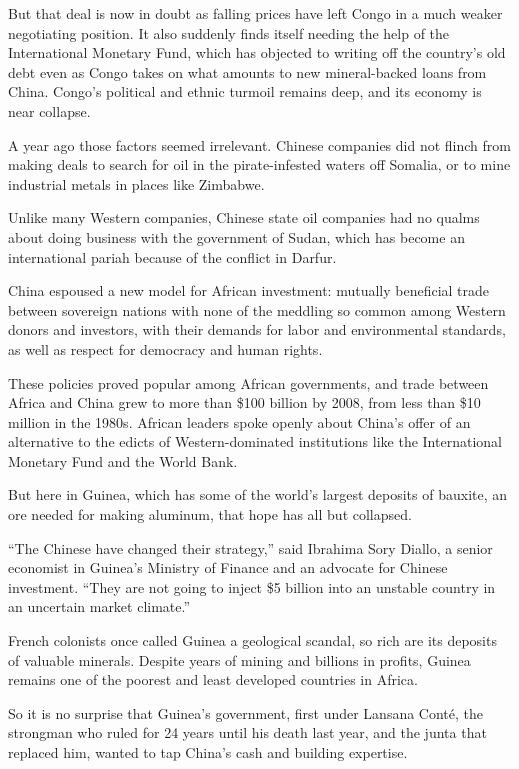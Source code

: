 \documentclass[12pt,a4paper,onecolumn]{article}
\begin{document}
\begin{CJK*}{GBK}{song}
But that deal is now in doubt as falling prices have left Congo in a much weaker negotiating
position. It also suddenly finds itself needing the help of the International Monetary Fund, which
has objected to writing off the country's old debt even as Congo takes on what amounts to new
mineral-backed loans from China. Congo's political and ethnic turmoil remains deep, and its economy
is near collapse.

A year ago those factors seemed irrelevant. Chinese companies did not flinch from making deals to
search for oil in the pirate-infested waters off Somalia, or to mine industrial metals in places
like Zimbabwe.

Unlike many Western companies, Chinese state oil companies had no qualms about doing business with
the government of Sudan, which has become an international pariah because of the conflict in Darfur.

China espoused a new model for African investment: mutually beneficial trade between sovereign
nations with none of the meddling so common among Western donors and investors, with their demands
for labor and environmental standards, as well as respect for democracy and human rights.

These policies proved popular among African governments, and trade between Africa and China grew to
more than \$100 billion by 2008, from less than \$10 million in the 1980s. African leaders spoke
openly about China's offer of an alternative to the edicts of Western-dominated institutions like
the International Monetary Fund and the World Bank.

But here in Guinea, which has some of the world's largest deposits of bauxite, an ore needed for
making aluminum, that hope has all but collapsed.

``The Chinese have changed their strategy,'' said Ibrahima Sory Diallo, a senior economist in
Guinea's Ministry of Finance and an advocate for Chinese investment. ``They are not going to inject
\$5 billion into an unstable country in an uncertain market climate.''

French colonists once called Guinea a geological scandal, so rich are its deposits of valuable
minerals. Despite years of mining and billions in profits, Guinea remains one of the poorest and
least developed countries in Africa.

So it is no surprise that Guinea's government, first under Lansana Cont\'e, the strongman who ruled
for 24 years until his death last year, and the junta that replaced him, wanted to tap China's cash
and building expertise.


\end{CJK*}
\end{document}
